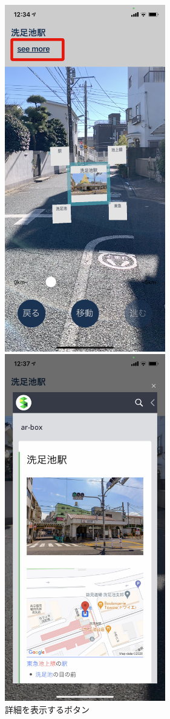 \begin{figure}[h]
  \begin{minipage}{0.5\hsize}
    \centering
    \includegraphics[width=70mm]{images/hypar_touch_top.png}
    \caption{詳細を表示するボタン} \label{fig:hypar_touch_top}
  \end{minipage}
  \begin{minipage}{0.5\hsize}
    \centering
    \includegraphics[width=70mm]{images/hypar_touch_webview.png}

\end{minipage}
\end{figure}
